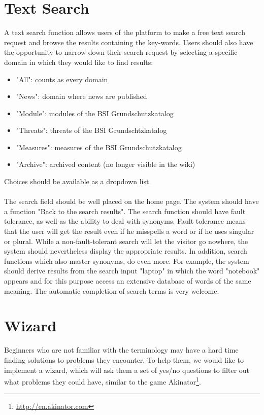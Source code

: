 \section{Text Search}
\label{search_function}
A text search function allows users of the platform to make a free text search request and browse the results containing the key-words. 
Users should also have the opportunity to narrow down their search request by selecting a specific domain in which they would like to find results:
\begin{itemize}
\item "All": counts as every domain
\item "News": domain where news are published
\item "Module": modules of the BSI Grundschutzkatalog
\item "Threats": threats of the BSI Grundschtzkatalog
\item "Measures": measures of the BSI Grundschutzkatalog
\item "Archive": archived content (no longer visible in the wiki)
\end{itemize}
 
Choices should be available as a dropdown list.
\\\\
The search field should be well placed on the home page. 
The system should have a function "Back to the search results". 
The search function should have fault tolerance, as well as the ability to deal with synonyms. 
Fault tolerance means that the user will get the result even if he misspells a word or if he uses singular or plural. 
While a non-fault-tolerant search will let the visitor go nowhere, the system should nevertheless display the appropriate results.
In addition, search functions which also master synonyms, do even more. 
For example, the system should derive results from the search input "laptop" in which the word "notebook" appears and for this purpose access an extensive database of words of the same meaning. 
The automatic completion of search terms is very welcome.
  

\section{Wizard}
\label{wizard}
Beginners who are not familiar with the terminology may have a hard time finding solutions to problems they encounter. 
To help them, we would like to implement a wizard, which will ask them a set of yes/no questions to filter out what problems they could have, similar to the game Akinator\footnote{\url{http://en.akinator.com}}. 
 
